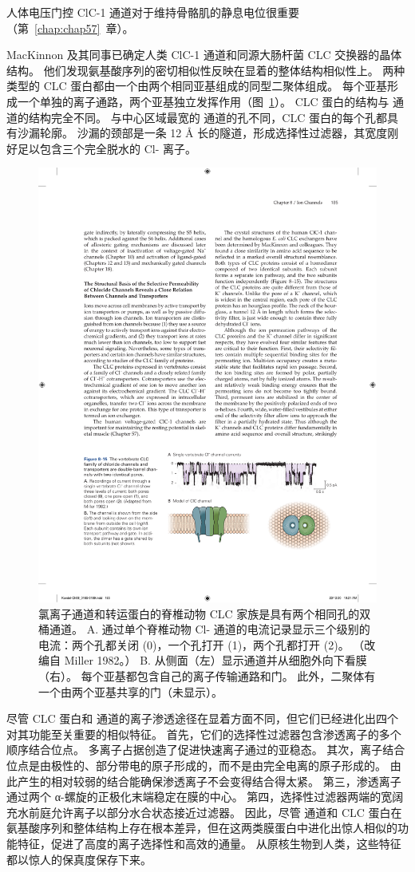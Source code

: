 人体电压门控 ClC-1 通道对于维持骨骼肌的静息电位很重要（第~\ref{chap:chap57}~章）。


MacKinnon 及其同事已确定人类 ClC-1 通道和同源大肠杆菌 CLC 交换器的晶体结构。
他们发现氨基酸序列的密切相似性反映在显着的整体结构相似性上。
两种类型的 CLC 蛋白都由一个由两个相同亚基组成的同型二聚体组成。
每个亚基形成一个单独的离子通路，两个亚基独立发挥作用（图~\ref{fig:8_15}）。
CLC 蛋白的结构与  通道的结构完全不同。
与中心区域最宽的  通道的孔不同，CLC 蛋白的每个孔都具有沙漏轮廓。
沙漏的颈部是一条 12 Å 长的隧道，形成选择性过滤器，其宽度刚好足以包含三个完全脱水的 Cl- 离子。


\begin{figure}[htbp]
	\centering
	\includegraphics[width=0.6\linewidth]{chap08/fig_8_15}
	\caption{氯离子通道和转运蛋白的脊椎动物 CLC 家族是具有两个相同孔的双桶通道。 A. 通过单个脊椎动物 Cl- 通道的电流记录显示三个级别的电流：两个孔都关闭 (0)，一个孔打开 (1)，两个孔都打开 (2)。 （改编自 Miller 1982。） B. 从侧面（左）显示通道并从细胞外向下看膜（右）。 每个亚基都包含自己的离子传输通路和门。 此外，二聚体有一个由两个亚基共享的门（未显示）。}
	\label{fig:8_15}
\end{figure}


尽管 CLC 蛋白和  通道的离子渗透途径在显着方面不同，但它们已经进化出四个对其功能至关重要的相似特征。
首先，它们的选择性过滤器包含渗透离子的多个顺序结合位点。
多离子占据创造了促进快速离子通过的亚稳态。
其次，离子结合位点是由极性的、部分带电的原子形成的，而不是由完全电离的原子形成的。
由此产生的相对较弱的结合能确保渗透离子不会变得结合得太紧。
第三，渗透离子通过两个 α-螺旋的正极化末端稳定在膜的中心。
第四，选择性过滤器两端的宽阔充水前庭允许离子以部分水合状态接近过滤器。
因此，尽管  通道和 CLC 蛋白在氨基酸序列和整体结构上存在根本差异，但在这两类膜蛋白中进化出惊人相似的功能特征，促进了高度的离子选择性和高效的通量。 
从原核生物到人类，这些特征都以惊人的保真度保存下来。


